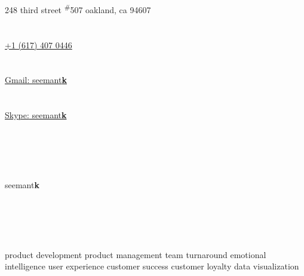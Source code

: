 \documentclass[]{friggeri-cv} %
\begin{document}
\begin{aside} %
\section{{\scriptsize {}}}
248 third street
\textsuperscript{\#}507
oakland, ca 94607
~
\section{\scriptsize {}}
\href{tel:617.407.0446}{+1 (617) 407 0446}
~
\section{\scriptsize {}}
\href{mailto:seemantk@gmail.com}{Gmail: seemant\textbf{k}}
~
\section{\scriptsize {}}
\href{skype:seemantk}{{\color{LightGray}Skype:} seemant\textbf{k}}
~
\section{\href{http://www.github.com/seemantk}{{\scriptsize {}}} ~ \href{http://www.twitter.com/seemantk}{{\scriptsize {}}} ~ \href{http://www.linkedin.com/in/seemantk}{{\scriptsize {}}}}
seemant\textbf{k}
~
~
\section{{\scriptsize {} ~~ }}
product development
product management
team turnaround
emotional intelligence
user experience
customer success
customer loyalty
data visualization
\end{aside}
\end{document}
